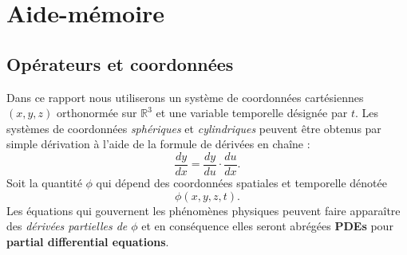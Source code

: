 \chapter{Aide-mémoire}

\section{Opérateurs et coordonnées}
Dans ce rapport nous utiliserons un système de coordonnées cartésiennes $(x, y, z)$ orthonormée sur $\mathbb{R}^3$ et une variable temporelle désignée par $t$. Les systèmes de coordonnées \textit{sphériques} et \textit{cylindriques} peuvent être obtenus par simple dérivation à l'aide de la formule de dérivées en chaîne : \[\frac{d y}{dx} = \frac{dy}{du}\cdot\frac{du}{dx}.\]
Soit la quantité $\phi$ qui dépend des coordonnées spatiales et temporelle dénotée \[\phi (x, y, z, t).\]
Les équations qui gouvernent les phénomènes physiques peuvent faire apparaître des \textit{dérivées partielles de $\phi$} et en conséquence elles seront abrégées \textbf{PDEs} pour \textbf{partial differential equations}.\\

